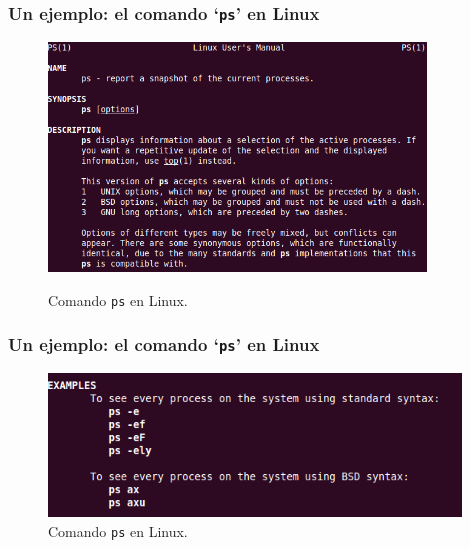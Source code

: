 \documentclass{beamer}
\begin{document}

\begin{frame}
\frametitle{Un ejemplo: el comando `\texttt{ps}' en Linux}

\begin{figure}[h]

\begin{center}
  \includegraphics[height=2.4in]{figs/ps.png} \\
\caption{{\footnotesize Comando \texttt{ps} en Linux.}}
\end{center}
\end{figure}

\end{frame}


\begin{frame}
\frametitle{Un ejemplo: el comando `\texttt{ps}' en Linux}

\begin{figure}[h]

\begin{center}
  \includegraphics[height=1.5in]{figs/ps-2.png}
\caption{{\footnotesize Comando \texttt{ps} en Linux.}}
\end{center}
\end{figure}

\end{frame}


\end{document}
